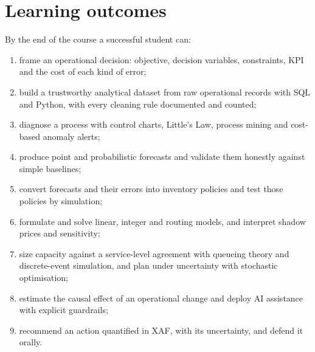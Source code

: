 \section*{Learning outcomes}
By the end of the course a successful student can:
\begin{enumerate}[label=\textbf{LO\arabic*.},leftmargin=3.2em]
\item frame an operational decision: objective, decision variables, constraints, KPI and the cost of each kind of error;
\item build a trustworthy analytical dataset from raw operational records with SQL and Python, with every cleaning rule documented and counted;
\item diagnose a process with control charts, Little's Law, process mining and cost-based anomaly alerts;
\item produce point and probabilistic forecasts and validate them honestly against simple baselines;
\item convert forecasts and their errors into inventory policies and test those policies by simulation;
\item formulate and solve linear, integer and routing models, and interpret shadow prices and sensitivity;
\item size capacity against a service-level agreement with queueing theory and discrete-event simulation, and plan under uncertainty with stochastic optimisation;
\item estimate the causal effect of an operational change and deploy AI assistance with explicit guardrails;
\item recommend an action quantified in XAF, with its uncertainty, and defend it orally.
\end{enumerate}

